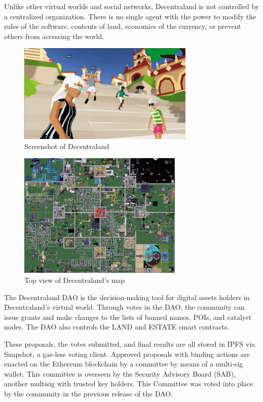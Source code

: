 \documentclass[MSE,Master,english]{twbook}%
\begin{document}
Unlike other virtual worlds and social networks, Decentraland is not controlled by a centralized organization\cite{DCLWhitepaper}. There is no single agent with the power to modify the rules of the software, contents of land, economics of the currency, or prevent others from accessing the world.

\begin{figure}[H]
  \centering
  \includegraphics[width=0.75\textwidth]{dcl.png}
  \caption{Screenshot of Decentraland}
  \label{fig:dcl}
\end{figure}

\begin{figure}[H]
  \centering
  \includegraphics[width=0.70\textwidth]{dcl_map.png}
  \caption{Top view of Decentraland's map \cite{genesisCity}}
  \label{fig:dcl_map}
\end{figure}

The Decentraland \gls{DAO}\cite{DCLDAO} is the decision-making tool for digital assets holders in Decentraland's virtual world. Through votes in the \gls{DAO}, the community can issue grants and make changes to the lists of banned names, POIs, and catalyst nodes. The \gls{DAO} also controls the \gls{LAND} and \gls{ESTATE} smart contracts.

These proposals, the votes submitted, and final results are all stored in \ac{IPFS} via Snapshot, a gas-less voting client. Approved proposals with binding actions are enacted on the Ethereum blockchain by a committee by means of a multi-sig wallet. This committee is overseen by the Security Advisory Board (\gls{SAB}), another multisig with trusted key holders. This Committee was voted into place by the community in the previous release of the \gls{DAO}.
\pagebreak
\end{document}
